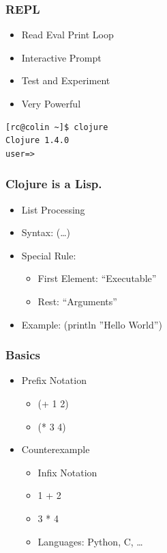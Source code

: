 \documentclass{beamer}
\begin{document}
\begin{frame}[fragile]
\frametitle{REPL}

\begin{itemize}
\item Read Eval Print Loop
\item Interactive Prompt
\item Test and Experiment
\item Very Powerful
\end{itemize}
\begin{lstlisting}[basicstyle=\scriptsize]
[rc@colin ~]$ clojure
Clojure 1.4.0
user=>
\end{lstlisting}
\end{frame}

  \begin{frame}
      \frametitle{Clojure is a Lisp.}

      \begin{itemize}
          \item List Processing
          \item Syntax: (\ldots)
          \item Special Rule:
              \begin{itemize}
                  \item First Element: ``Executable''
                  \item Rest: ``Arguments''
              \end{itemize}
          \item Example: (println ''Hello World'')
      \end{itemize}
  \end{frame}

  \begin{frame}
      \frametitle{Basics}

      \begin{itemize}
          \item Prefix Notation
              \begin{itemize}
                  \item (+ 1 2)
                  \item (* 3 4)
              \end{itemize}
          \item Counterexample
              \begin{itemize}
                  \item Infix Notation
                  \item 1 + 2
                  \item 3 * 4
                  \item Languages: Python, C, \ldots
              \end{itemize}
      \end{itemize}
  \end{frame}
\end{document}

